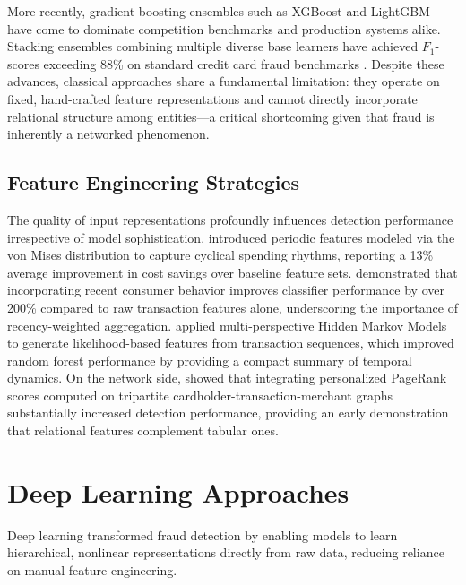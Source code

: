 More recently, gradient boosting ensembles such as XGBoost and LightGBM have come
to dominate competition benchmarks and production systems alike. Stacking ensembles
combining multiple diverse base learners have achieved $F_1$-scores exceeding 88\% on
standard credit card fraud benchmarks \cite{ileberi2024enhancing}. Despite these
advances, classical approaches share a fundamental limitation: they operate on fixed,
hand-crafted feature representations and cannot directly incorporate relational
structure among entities—a critical shortcoming given that fraud is inherently a
networked phenomenon.

\subsection{Feature Engineering Strategies}

The quality of input representations profoundly influences detection performance
irrespective of model sophistication.\cite{bahnsen2016feature} introduced periodic features modeled via the
von Mises distribution to capture cyclical spending rhythms, reporting a 13\% average
improvement in cost savings over baseline feature sets. \cite{dalpozzolo2014learned}
demonstrated that incorporating recent consumer behavior improves classifier performance
by over 200\% compared to raw transaction features alone, underscoring the importance
of recency-weighted aggregation. \cite{lucas2019towards} applied multi-perspective
Hidden Markov Models to generate likelihood-based features from transaction sequences,
which improved random forest performance by providing a compact summary of temporal
dynamics. On the network side, \cite{vanvlasselaer2015apate} showed that integrating
personalized PageRank scores computed on tripartite cardholder-transaction-merchant
graphs substantially increased detection performance, providing an early demonstration
that relational features complement tabular ones.

\section{Deep Learning Approaches}

Deep learning transformed fraud detection by enabling models to learn hierarchical,
nonlinear representations directly from raw data, reducing reliance on manual feature
engineering.

